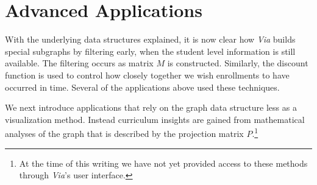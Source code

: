\section{Advanced Applications}
\label{sec:advanced}

With the underlying data structures explained, it is now clear how
{\em Via} builds special subgraphs by filtering early, when the
student level information is still available. The filtering occurs as
matrix $M$ is constructed. Similarly, the discount function is used to
control how closely together we wish enrollments to have occurred in
time. Several of the applications above used these techniques.

We next introduce applications that rely on the graph data structure
less as a visualization method. Instead curriculum insights are gained
from mathematical analyses of the graph that is described by the
projection matrix $P$.\footnote{At the time of this writing we have not
  yet provided access to these methods through {\em Via}'s user
  interface.}




